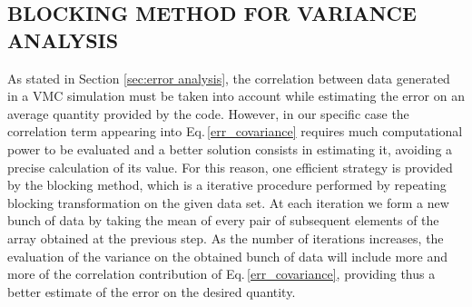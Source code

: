 \subsection{BLOCKING METHOD FOR VARIANCE ANALYSIS} \label{sec:blocking_method}
As stated in Section \ref{sec:error analysis}, the correlation between data generated in a VMC simulation must be taken into account while estimating the error on an average quantity provided by the code. However, in our specific case the correlation term appearing into Eq.\,\ref{err_covariance} requires much computational power to be evaluated and a better solution consists in estimating it, avoiding a precise calculation of its value. For this reason, one efficient strategy is provided by the blocking method, which is a iterative procedure performed by repeating blocking transformation on the given data set. At each iteration we form a new bunch of data by taking the mean of every pair of subsequent elements of the array obtained at the previous step. As the number of iterations increases, the evaluation of the variance on the obtained bunch of data will include more and more of the correlation contribution of Eq.\,\ref{err_covariance}, providing thus a better estimate of the error on the desired quantity.

